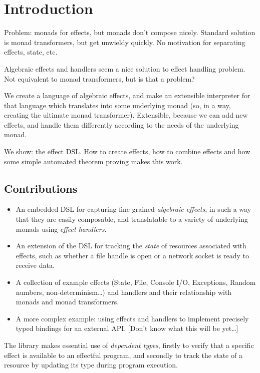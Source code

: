 \section{Introduction}

Problem: monads for effects, but monads don't compose nicely. Standard
solution is monad transformers, but get unwieldy quickly. No motivation
for separating effects, state, etc.

Algebraic effects and handlers seem a nice solution to effect handling
problem. Not equivalent to monad transformers, but is that a problem?

We create a language of algebraic effects, and make an extensible interpreter
for that language which translates into some underlying monad (so, in a way,
creating the ultimate monad transformer). 
Extensible, because we can add new effects, and handle them differently 
according to the needs of the underlying monad.

We show: the effect DSL. How to create effects, how to combine effects and
how some simple automated theorem proving makes this work.

\subsection{Contributions}

\begin{itemize}
\item An embedded DSL for capturing fine grained \emph{algebraic effects}, in
such a way that they are easily composable, and translatable to a variety of
underlying monads using \emph{effect handlers}.
\item An extension of the DSL for tracking the \emph{state} of resources
associated with effects, such as whether a file handle is open or a network
socket is ready to receive data.
\item A collection of example effects (State, File, Console I/O, Exceptions,
Random numbers, non-determinism\ldots) and handlers and their
relationship with monads and monad transformers.
\item A more complex example: using effects and handlers to implement
precisely typed bindings for an external API. [Don't know what this will be
yet\ldots]
\end{itemize}

The library makes essential use of \emph{dependent types}, firstly to verify
that a specific effect is available to an effectful program, and secondly
to track the state of a resource by updating its type during program
execution.

